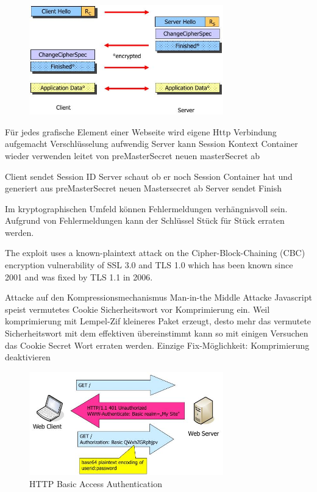\documentclass[ngerman,a4paper,12pt]{scrreprt}
\begin{document}
\begin{figure}[H]
	\centering
	\includegraphics[width=0.75\textwidth]{img/V9.6.jpg}
	\caption{}
	\label{}
\end{figure}

\ul
	\li Für jedes grafische Element einer Webseite wird eigene Http Verbindung aufgemacht \ra Verschlüsselung aufwendig
	\li Server kann Session Kontext Container wieder verwenden \ra leitet von preMasterSecret neuen masterSecret ab
\ulE

\ol
	\li Client sendet Session ID
	\li Server schaut ob er noch Session Container hat und generiert aus preMasterSecret neuen Mastersecret ab
	\li Server sendet Finish
\olE


\ul
	\li Im kryptographischen Umfeld können Fehlermeldungen verhängnisvoll sein. Aufgrund von Fehlermeldungen kann der Schlüssel Stück für Stück erraten werden.
\ulE

The exploit uses a known-plaintext attack on the Cipher-Block-Chaining
(CBC) encryption vulnerability of SSL 3.0 and TLS 1.0
which has been known since 2001 and was fixed by TLS 1.1 in 2006.

\ul
	\li Attacke auf den Kompressionsmechanismus
	\li Man-in-the Middle Attacke
	\li Javascript speist vermutetes Cookie Sicherheitswort vor Komprimierung ein. Weil komprimierung mit Lempel-Zif kleineres Paket erzeugt, desto mehr das vermutete Sicherheitswort mit dem effektiven übereinstimmt kann so mit einigen Versuchen das Cookie Secret Wort erraten werden.
	\li Einzige Fix-Möglichkeit: Komprimierung deaktivieren
\ulE


\begin{figure}[H]
	\centering
	\includegraphics[width=0.75\textwidth]{img/V10.1.jpg}
	\caption{HTTP Basic Access Authentication}
	\label{}
\end{figure}
\end{document}

